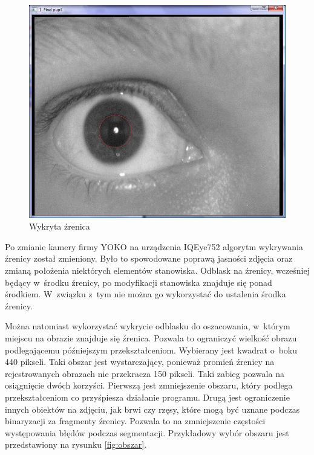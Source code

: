 \begin{figure}[h!]
\begin{center}
\includegraphics[scale=0.5]{zrenica.jpg}
\caption{Wykryta źrenica}
\label{fig:zrenicaNasza}
\end{center}
\end{figure}

Po zmianie kamery firmy YOKO na urządzenia IQEye752 algorytm wykrywania źrenicy został zmieniony. Było to spowodowane poprawą jasności zdjęcia oraz zmianą położenia niektórych elementów stanowiska. Odblask na źrenicy, wcześniej będący w~środku źrenicy, po modyfikacji stanowiska znajduje się ponad środkiem. W~związku z~tym nie można go wykorzystać do ustalenia środka źrenicy.

Można natomiast wykorzystać wykrycie odblasku do oszacowania, w~którym miejscu na obrazie znajduje się źrenica. Pozwala to ograniczyć wielkość obrazu podlegającemu późniejszym przekształceniom. Wybierany jest kwadrat o~boku 440 pikseli. Taki obszar jest wystarczający, ponieważ promień źrenicy na rejestrowanych obrazach nie przekracza 150 pikseli. Taki zabieg pozwala na osiągnięcie dwóch korzyści. Pierwszą jest zmniejszenie obszaru, który podlega przekształceniom co przyśpiesza działanie programu. Drugą jest ograniczenie innych obiektów na zdjęciu, jak brwi czy rzęsy, które mogą być uznane podczas binaryzacji za fragmenty źrenicy. Pozwala to na zmniejszenie częstości występowania błędów podczas segmentacji. Przykładowy wybór obszaru jest przedstawiony na rysunku \ref{fig:obszar}.

